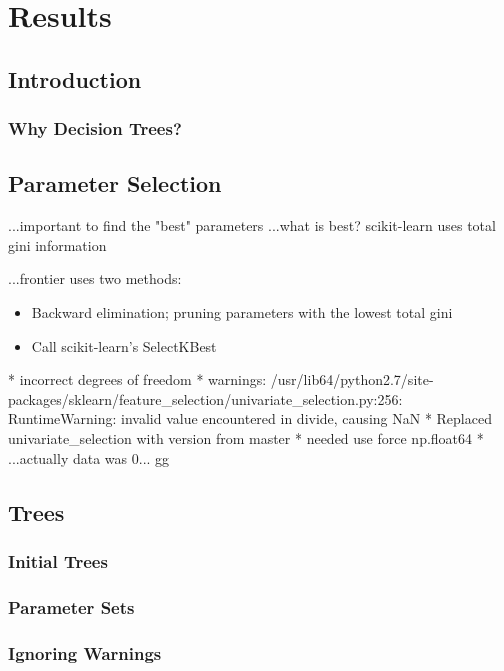 \chapter{Results}
\section{Introduction}
\subsection{Why Decision Trees?}

\section{Parameter Selection}
...important to find the "best" parameters
...what is best? scikit-learn uses total gini information

...frontier uses two methods:
\begin{itemize}
    \item Backward elimination; pruning parameters with the lowest total gini
    \item Call scikit-learn's SelectKBest
\end{itemize}


* incorrect degrees of freedom
* warnings: /usr/lib64/python2.7/site-packages/sklearn/feature\_selection/univariate\_selection.py:256: RuntimeWarning: invalid value encountered in divide, causing NaN
* Replaced univariate\_selection with version from master
* needed use force np.float64
* ...actually data was 0... gg


\section{Trees}
\subsection{Initial Trees}
\subsection{Parameter Sets}
\subsection{Ignoring Warnings}
